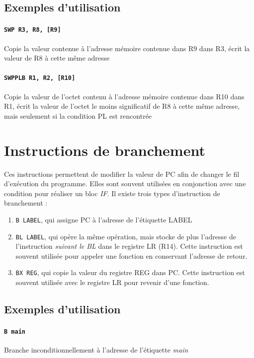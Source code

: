 \documentclass{tufte-handout}
\begin{document}
\subsection{Exemples d'utilisation}

\paragraph{\texttt{SWP R3, R8, [R9]}} Copie la valeur contenue à l'adresse mémoire contenue dans R9 dans R3, écrit la valeur de R8 à cette même adresse

\paragraph{\texttt{SWPPLB R1, R2, [R10]}} Copie la valeur de l'octet contenu à l'adresse mémoire contenue dans R10 dans R1, écrit la valeur de l'octet le moins significatif de R8 à cette même adresse, mais seulement si la condition PL est rencontrée

\clearpage
\section{Instructions de branchement}

Ces instructions permettent de modifier la valeur de PC afin de changer le fil d'exécution du programme. Elles sont souvent utilisées en conjonction avec une condition pour réaliser un bloc \textit{IF}. Il existe trois types d'instruction de branchement :
\begin{enumerate}
	\item \texttt{B LABEL}, qui assigne PC à l'adresse de l'étiquette LABEL
	\item \texttt{BL LABEL}, qui opère la même opération, mais stocke de plus l'adresse de l'instruction \textit{suivant le BL} dans le registre LR (R14). Cette instruction est souvent utilisée pour appeler une fonction en conservant l'adresse de retour.
	\item \texttt{BX REG}, qui copie la valeur du registre REG dans PC. Cette instruction est souvent utilisée avec le registre LR pour revenir d'une fonction.
\end{enumerate}

\subsection{Exemples d'utilisation}

\paragraph{\texttt{B main}} Branche inconditionnellement à l'adresse de l'étiquette \textit{main}
\end{document}
